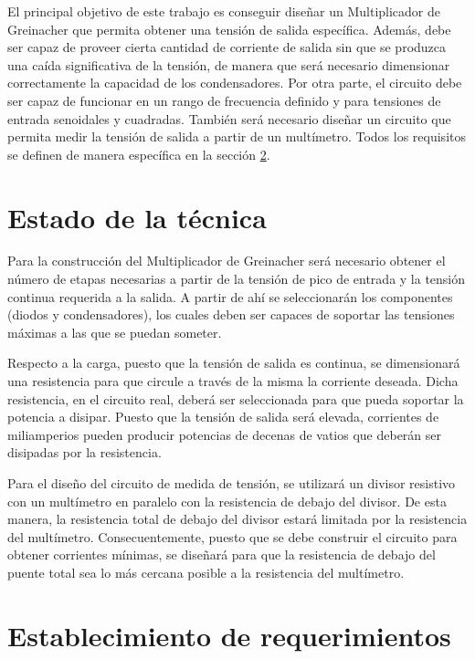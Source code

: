 El principal objetivo de este trabajo es conseguir diseñar un Multiplicador de Greinacher que permita obtener una tensión de salida específica.
Además, debe ser capaz de proveer cierta cantidad de corriente de salida sin que se produzca una caída significativa de la tensión, de manera que será
necesario dimensionar correctamente la capacidad de los condensadores. Por otra parte, el circuito debe ser capaz de funcionar en un rango de frecuencia definido
y para tensiones de entrada senoidales y cuadradas. También será necesario diseñar un circuito que permita medir la tensión de salida a partir de un multímetro.
Todos los requisitos se definen de manera específica en la sección \ref{requisitos}.

\section{Estado de la técnica}

Para la construcción del Multiplicador de Greinacher será necesario obtener el número de etapas necesarias a partir de la tensión de pico de entrada y
la tensión continua requerida a la salida. A partir de ahí se seleccionarán los componentes (diodos y condensadores), los cuales deben ser capaces de soportar las tensiones máximas
a las que se puedan someter.

Respecto a la carga, puesto que la tensión de salida es continua, se dimensionará una resistencia para que circule a través de la misma la corriente deseada.
Dicha resistencia, en el circuito real, deberá ser seleccionada para que pueda soportar la potencia a disipar. Puesto que la tensión de salida será elevada,
corrientes de miliamperios pueden producir potencias de decenas de vatios que deberán ser disipadas por la resistencia.

Para el diseño del circuito de medida de tensión, se utilizará un divisor resistivo con un multímetro en paralelo con la resistencia de debajo del divisor.
De esta manera, la resistencia total de debajo del divisor estará limitada por la resistencia del multímetro. Consecuentemente, puesto
que se debe construir el circuito para obtener corrientes mínimas, se diseñará para que la resistencia de debajo del puente total sea lo más cercana posible a la
resistencia del multímetro.

\section{Establecimiento de requerimientos} \label{requisitos}

